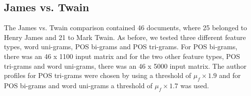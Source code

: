 \documentclass[a4paper,10pt,twoside,fleqn]{article}
\begin{document}
\subsection{James vs. Twain} \label{sec:twain-james}
The James vs. Twain comparison contained 46 documents, where 
25 belonged to Henry James and 21 to  Mark Twain. 
As before, we tested three different feature types, word uni-grams, 
POS bi-grams and POS tri-grams. 
For POS bi-grams, there was an 46 x 1100 input matrix and for 
the two other feature types, POS tri-grams and word uni-grams, 
there was an 46 x 5000 input matrix. 
The author profiles for POS tri-grams were chosen
by using a threshold of $\mu_f \times 1.9$ and for
POS bi-grams and word uni-grams a threshold of $\mu_f \times 1.7$
was used. 
\end{document}
